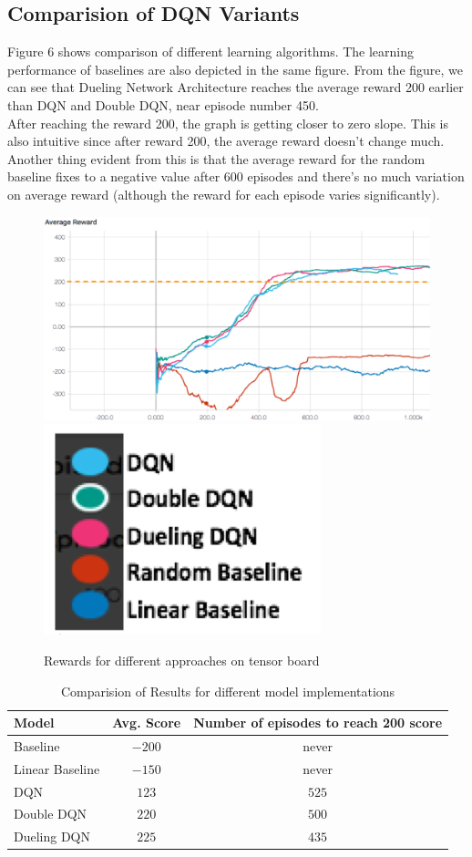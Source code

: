 \subsection{ Comparision of DQN Variants}

Figure 6 shows comparison of different learning algorithms. The learning performance of baselines are also depicted in the same figure. From the figure, we can see that Dueling Network Architecture reaches the average reward 200 earlier than DQN and Double DQN, near episode number 450. \\

After reaching the reward 200, the graph is getting closer to zero slope. This is also intuitive since after reward 200, the average reward doesn’t change much. \\

Another thing evident from this is that the average reward for the random baseline fixes to a negative value after 600 episodes and there’s no much variation on average reward (although the reward for each episode varies significantly). \\
 
\begin{figure}[!ht]
\centering
\includegraphics[scale=0.75,width=0.75\columnwidth]{figures/Picture1.png}%
\includegraphics[scale=0.15,width=0.15\columnwidth]{figures/Legend.png}%
\caption{ Rewards for different approaches on tensor board}%
\label{fig:Visualization}%
\end{figure}

\label{sec:exp}
\begin{table}%
\centering
\begin{tabular}{|l|c|c|}
\hline
Model & Avg. Score  & Number of episodes to reach 200 score  \\
\hline
Baseline & $-200$ & never \\
\hline
Linear Baseline & $-150$ & never \\
\hline
DQN & $123$ & $525$ \\
\hline
Double DQN & $220$ & $500$ \\
\hline
Dueling DQN & $225$ & $435$ \\
\hline
\end{tabular}
\caption{Comparision of Results for different model implementations}
\label{tab:Variants of DQN}
\end{table}


